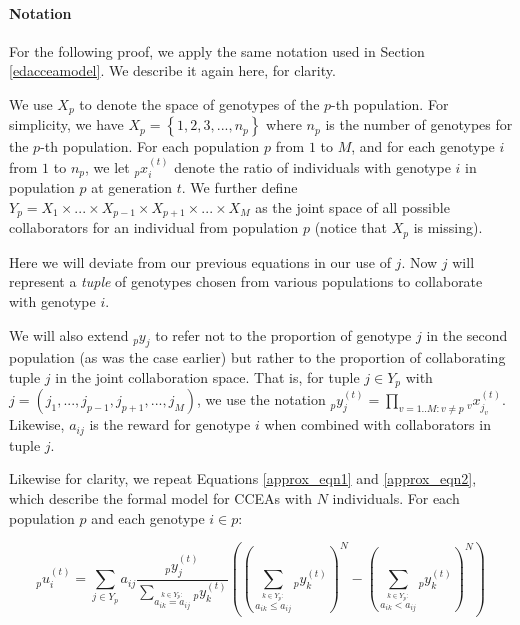\documentclass{sig-alt-full}
\newcommand\prodc[1]{\prod_{#1}}
\newcommand\suma[1]{\displaystyle\sum_{#1}}
\newcommand\sumb[2]{\displaystyle\sum_{\stackrel{{#1} :}{#2}}}
\begin{document}
\paragraph{Notation} For the following proof, we apply the same notation used in Section \ref{edacceamodel}. We describe it again here, for clarity.

We use $X_p$ to denote the space of genotypes of the $p$-th population.  For simplicity, we have $X_p = \left\{1, 2, 3, ..., n_p \right\}$ where $n_p$ is the number of genotypes for the $p$-th population.  For each population $p$ from $1$ to $M$, and for each genotype $i$ from $1$ to $n_p$, we let ${_p}x^{(t)}_i$ denote the ratio of individuals with genotype $i$ in population $p$ at generation $t$.  We further define $Y_{p} = X_1 \times  ... \times X_{p-1} \times X_{p+1} \times ... \times X_M$ as the joint space of all possible collaborators for an individual from population $p$ (notice that \(X_p\) is missing).  

\onecolumn 

\begin{multicols}{2}

Here we will deviate from our previous equations in our use of \(j\).  Now \(j\) will represent a {\it tuple} of genotypes chosen from various populations to collaborate with genotype \(i\).

We will also extend \({_p}y_j\) to refer not to the proportion of genotype \(j\) in the second population (as was the case earlier) but rather to the proportion of collaborating tuple \(j\) in the joint collaboration space.  That is, for tuple $j \in Y_{p}$ with $j = \left( j_1, ..., j_{p-1}, j_{p+1}, ..., j_M \right)$, we use the notation ${_p}y^{(t)}_j = \prodc{v=1..M: v \ne p} {_v}x^{(t)}_{j_v}$.  Likewise, $a_{i j}$ is the reward for genotype $i$ when combined with collaborators in tuple $j$.

Likewise for clarity, we repeat Equations \ref{approx_eqn1} and \ref{approx_eqn2}, which describe the formal model for CCEAs with \(N\) individuals.  For each population \(p\) and each genotype \(i \in p\):
\end{multicols}

\vspace{-1em}
\begin{equation}
{_p}u^{(t)}_i =\suma{j \in Y_{p}} a_{i j} \frac{{_p}y^{(t)}_j}{\sumb{k \in Y_{p}}{a_{i k} = a_{i j}} {_p}y^{(t)}_k}  \left(  \left (\sumb{k \in Y_{p}}{a_{i k} \leq a_{i j} } {_p}y^{(t)}_k \right)^N - \left( \sumb{k \in Y_{p}}{a_{i k} < a_{i j} } {_p}y^{(t)}_k  \right)^N \right ) 
\end{equation}
\end{document}
